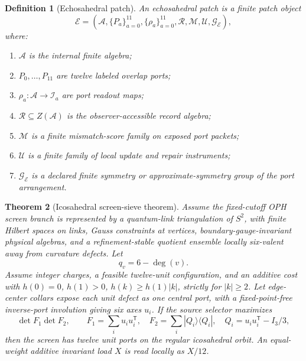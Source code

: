 \documentclass[11pt]{article}
\newtheorem{theorem}{Theorem}[section]
\newtheorem{definition}[theorem]{Definition}
\theoremstyle{remark}
\theoremstyle{plain}
\begin{document}
\begin{definition}[Echosahedral patch]
An echosahedral patch is a finite patch object
\[
\mathcal E=(\mathcal A,\{P_a\}_{a=0}^{11},\{\rho_a\}_{a=0}^{11},
\mathcal R,\mathcal M,\mathcal U,\mathcal G_{\mathcal E}),
\]
where:
\begin{enumerate}[leftmargin=2em]
\item \(\mathcal A\) is the internal finite algebra;
\item \(P_0,\ldots,P_{11}\) are twelve labeled overlap ports;
\item \(\rho_a:\mathcal A\to \mathcal I_a\) are port readout maps;
\item \(\mathcal R\subseteq Z(\mathcal A)\) is the observer-accessible record algebra;
\item \(\mathcal M\) is a finite mismatch-score family on exposed port packets;
\item \(\mathcal U\) is a finite family of local update and repair instruments;
\item \(\mathcal G_{\mathcal E}\) is a declared finite symmetry or approximate-symmetry group of
the port arrangement.
\end{enumerate}
\end{definition}

\begin{theorem}[Icosahedral screen-sieve theorem]\label{thm:icosahedral-screen-sieve}
Assume the fixed-cutoff OPH screen branch is represented by a quantum-link
triangulation of \(S^2\), with finite Hilbert spaces on links, Gauss constraints
at vertices, boundary-gauge-invariant physical algebras, and a refinement-stable
quotient ensemble locally six-valent away from curvature defects. Let
\[
q_v=6-\deg(v).
\]
Assume integer charges, a feasible twelve-unit configuration, and an additive
cost with \(h(0)=0\), \(h(1)>0\), \(h(k)\ge h(1)|k|\), strictly for
\(|k|\ge2\). Let edge-center collars expose each unit defect as one central
port, with a fixed-point-free inverse-port involution giving six axes \(u_i\).
If the source selector maximizes
\[
 \det F_1\det F_2,\qquad
 F_1=\sum_i u_iu_i^{\mathsf T},\quad
 F_2=\sum_i|Q_i\rangle\langle Q_i|,\quad
 Q_i=u_iu_i^{\mathsf T}-I_3/3,
\]
then the screen has twelve unit ports on the regular icosahedral orbit. An
equal-weight additive invariant load \(X\) is read locally as \(X/12\).
\end{theorem}
\end{document}
